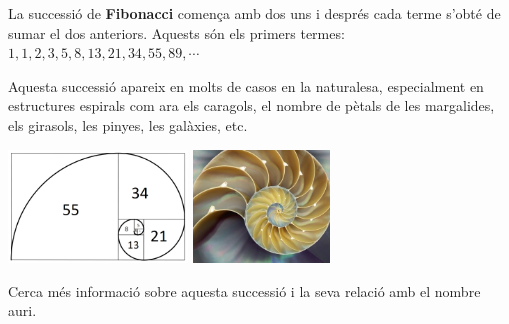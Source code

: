 \begin{blueshaded}
	
	La successió de \textbf{Fibonacci} comença amb dos uns i després cada terme s'obté de sumar el dos anteriors. Aquests són els primers termes:
	$
	 1, 1, 2, 3, 5, 8, 13, 21, 34, 55, 89, \cdots
	$
	
	Aquesta successió apareix en molts de casos en la naturalesa, especialment en estructures espirals com ara els caragols, el nombre de pètals de les margalides, els girasols, les pinyes, les galàxies, etc.
	
	\vspace{0.25cm}
	
	\begin{center}
		\includegraphics[height=3cm]{img-03/espiral.png}
		\includegraphics[height=3cm]{img-03/nautilus2.jpg}
	\end{center}

Cerca més informació sobre aquesta successió i  la seva relació amb el nombre auri.
	

\end{blueshaded}

\newpage
\resum 

